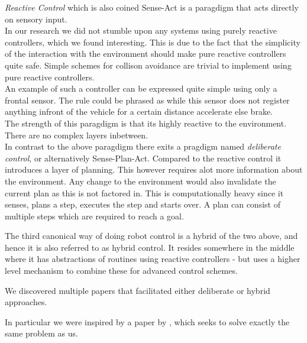 \textit{Reactive Control} which is also coined Sense-Act is a paragdigm that acts directly on sensory input.\\
In our research we did not stumble upon any systems using purely reactive controllers, which we found interesting. This is due to the fact that the simplicity of the interaction with the environment should make pure reactive controllers quite safe.
Simple schemes for collison avoidance are trivial to implement using pure reactive controllers.\\
An example of such a controller can be expressed quite simple using only a frontal sensor. The rule could be phrased as while this sensor does not register anything infront of the vehicle for a certain distance accelerate else brake.\\
The strength of this paragdigm is that its highly reactive to the environment. There are no complex layers inbetween.\\

In contrast to the above paragdigm there exits a pragdigm named \textit{deliberate control}, or alternatively Sense-Plan-Act.
Compared to the reactive control it introduces a layer of planning.
This however requires alot more information about the environment.
Any change to the environment would also invalidate the current plan as this is not factored in.
This is computationally heavy since it senses, plans a step, executes the step and starts over.
A plan can consist of multiple steps which are required to reach a goal.

The third canonical way of doing robot control is a hybrid of the two above, and hence it is also referred to as hybrid control.
It resides somewhere in the middle where it has abstractions of routines using reactive controllers - but uses a higher level mechanism to combine these for advanced control schemes.

We discovered multiple papers that facilitated either deliberate or hybrid approaches.

In particular we were inspired by a paper by \cite{texas}, which seeks to solve exactly the same problem as us.
